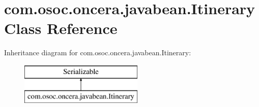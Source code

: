 \hypertarget{classcom_1_1osoc_1_1oncera_1_1javabean_1_1_itinerary}{}\section{com.\+osoc.\+oncera.\+javabean.\+Itinerary Class Reference}
\label{classcom_1_1osoc_1_1oncera_1_1javabean_1_1_itinerary}
Inheritance diagram for com.\+osoc.\+oncera.\+javabean.\+Itinerary\+:\begin{figure}[H]
\begin{center}
\leavevmode
\includegraphics[height=2.000000cm]{classcom_1_1osoc_1_1oncera_1_1javabean_1_1_itinerary}
\end{center}
\end{figure}
